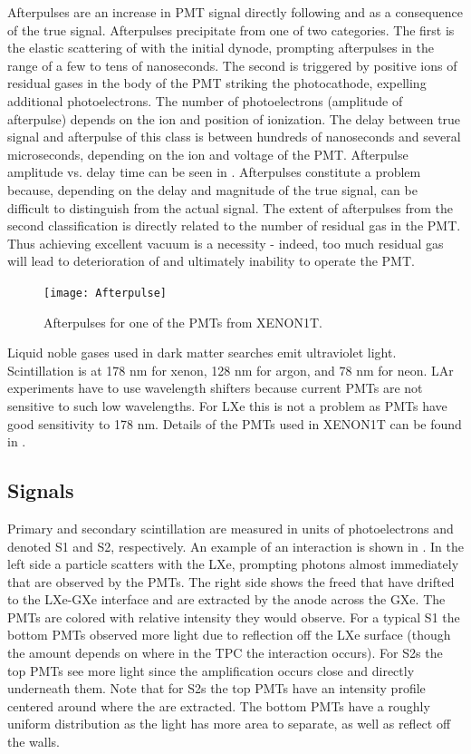 Afterpulses are an increase in PMT signal directly following and as a consequence of the true signal.  Afterpulses precipitate from one of
two categories.  The first is the elastic scattering of \electron with the initial dynode, prompting afterpulses in the range of a few
to tens of nanoseconds.  The second is triggered by positive ions of residual gases in the body of the PMT striking the photocathode,
expelling additional photoelectrons.  The number of photoelectrons (amplitude of afterpulse) depends on the ion and position of
ionization.  The delay between true signal and afterpulse of this class is between hundreds of nanoseconds and several microseconds,
depending on the ion and voltage of the PMT.  Afterpulse amplitude vs. delay time can be seen in .  Afterpulses
constitute a problem because, depending on the delay and magnitude of the true
signal, can be difficult to distinguish from the actual signal.  The extent of afterpulses from the second classification is directly
related to the number of residual gas in the PMT.  Thus achieving excellent vacuum is a necessity - indeed, too much residual gas will
lead to deterioration of and ultimately inability to operate the PMT.

\begin{figure}
\centering
\texttt{[image: Afterpulse]}
\caption{Afterpulses for one of the PMTs from XENON1T.}
\label{fig:tpcs_pmts_ap}
\end{figure}

Liquid noble gases used in dark matter searches emit ultraviolet light.  Scintillation is at 178 nm for xenon, 128 nm for argon, and
78 nm for neon.  LAr experiments have to use wavelength shifters because current PMTs are not sensitive to such low wavelengths.  For
LXe this is not a problem as PMTs have good sensitivity to 178 nm.  Details of the PMTs used in XENON1T can be found in \secref{}.



\subsection{Signals}
\label{subsec:tpcs_signals}
Primary and secondary scintillation are measured in units of photoelectrons and denoted S1 and S2, respectively.  An example of an
interaction is shown in .  In the left side a particle scatters with the LXe, prompting photons almost
immediately that are observed by the PMTs.  The right side shows the freed \electron that have drifted to the LXe-GXe interface and
are extracted by the anode across the GXe.  The PMTs are colored with relative intensity they would observe.  For a typical S1 the
bottom PMTs observed more light due to reflection off the LXe surface (though the amount depends on where in the TPC the interaction
occurs).  For S2s the top PMTs see more light since the amplification occurs close and directly underneath them.  Note that for S2s
the top PMTs have an intensity profile centered around where the \electron are extracted.  The bottom PMTs have a roughly uniform
distribution as the light has more area to separate, as well as reflect off the walls.

